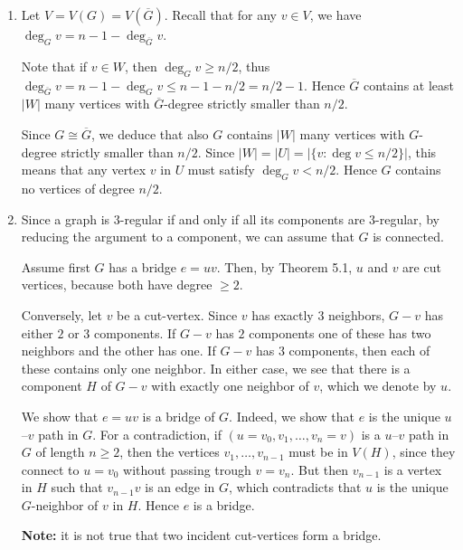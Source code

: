 \documentclass[11pt,answers]{exam}
\theoremstyle{definition}
\begin{document}
\begin{questions}
\begin{solution}
\begin{enumerate}[leftmargin=*, label=(\alph*)]
\item Let $V=V(G)=V(\overline G)$. Recall that for any $v \in V$, we have $\deg_G v = n-1 - \deg_{\overline G} v$. 

Note that if $v \in W$, then $\deg_G v\geq n/2$, thus $\deg_{\overline G} v= n-1 - \deg_G v\leq n-1-n/2=n/2-1$. Hence $\overline{G}$ contains at least $|W|$ many vertices with $\overline{G}$-degree strictly smaller than $n/2$. 

Since $G \cong \overline G$, we deduce that also $G$ contains $|W|$ many vertices with $G$-degree strictly smaller than $n/2$. Since $|W| = |U| = |\{ v : \deg v\leq n/2 \} |$, this means that any vertex $v$ in $U$ must satisfy $\deg_G v <n/2$. Hence  $G$ contains no vertices of degree $n/2$.

\item Since a graph is $3$-regular if and only if all its components are $3$-regular, by reducing the argument to a component, we can assume that $G$ is connected.

Assume first $G$ has a bridge $e=uv$. Then, by Theorem 5.1, $u$ and $v$ are cut vertices, because both have degree $\geq 2$.

Conversely, let $v$ be a cut-vertex. Since $v$ has exactly $3$ neighbors, $G-v$ has either $2$ or $3$ components. If $G-v$ has $2$ components one of these has two neighbors and the other has one. If $G-v$ has $3$ components, then each of these contains only one neighbor. In either case, we see that there is a component $H$ of $G-v$ with exactly one neighbor of $v$, which we denote by $u$. 

We show that $e=uv$ is a bridge of $G$. Indeed, we show that $e$ is the unique $u$--$v$ path in $G$. For a contradiction, if $(u=v_0, v_1, \dots, v_n=v)$ is a $u$--$v$ path in $G$ of length $n\geq 2$, then the vertices $v_1, \dots, v_{n-1}$ must be in $V(H)$, since they connect to $u=v_0$ without passing trough $v=v_n$. But then $v_{n-1}$ is a vertex in $H$ such that $v_{n-1} v$ is an edge in $G$, which contradicts that $u$ is the unique $G$-neighbor of $v$ in $H$. Hence $e$ is a bridge. 

\textbf{Note:} it is not true that two incident cut-vertices form a bridge.
\end{enumerate}
\end{solution}
\end{questions}
\end{document}
